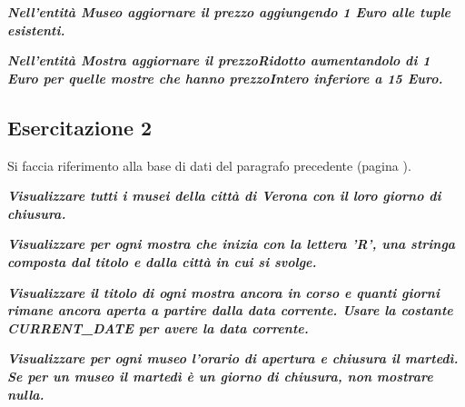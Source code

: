 \documentclass[a4paper]{article}
\begin{document}
	\noindent
	\:\newline

	\noindent
	\textcolor{Green4}{\textbf{\emph{Nell'entità Museo aggiornare il prezzo aggiungendo 1 Euro alle tuple esistenti.}}}\newline

	\noindent
	\:\newline

	\noindent
	\textcolor{Green4}{\textbf{\emph{Nell'entità Mostra aggiornare il prezzoRidotto aumentandolo di 1 Euro per quelle mostre che hanno prezzoIntero inferiore a 15 Euro.}}}\newline

	\noindent
	\newpage
	
	\subsection{Esercitazione 2}
	
	Si faccia riferimento alla base di dati del paragrafo precedente (pagina \pageref{par: Esercitazione 1}).\newline
	
	\noindent
	\textcolor{Green4}{\textbf{\emph{Visualizzare tutti i musei della città di Verona con il loro giorno di chiusura.}}}\newline
	
	\noindent
	\:\newline
	
	\noindent
	\textcolor{Green4}{\textbf{\emph{Visualizzare per ogni mostra che inizia con la lettera 'R', una stringa composta dal titolo e dalla città in cui si svolge.}}}\newline
	
	\noindent
	\:\newline

	\noindent
	\textcolor{Green4}{\textbf{\emph{Visualizzare il titolo di ogni mostra ancora in corso e quanti giorni rimane ancora aperta a partire dalla data corrente. Usare la costante \textsf{CURRENT\_DATE} per avere la data corrente.}}}\newline
	
	\noindent
	\:\newline

	\noindent
	\textcolor{Green4}{\textbf{\emph{Visualizzare per ogni museo l'orario di apertura e chiusura il martedì. Se per un museo il martedì è un giorno di chiusura, non mostrare nulla.}}}\newline
	
\end{document}

